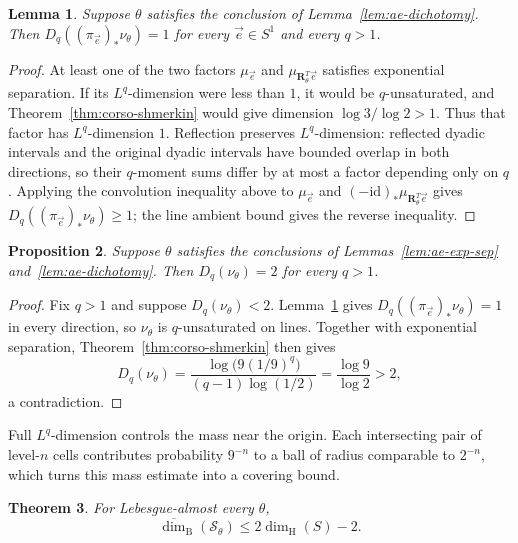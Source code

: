 \documentclass[scheme=plain]{ctexart}
\newtheorem{theorem}{Theorem}[section]
\newtheorem{lemma}[theorem]{Lemma}
\newtheorem{proposition}[theorem]{Proposition}
\newcommand{\dimhaus}{\dim_\mathrm{H}}
\begin{document}
\begin{lemma}
\label{lem:line-lq}
Suppose $\theta$ satisfies the conclusion of Lemma~\ref{lem:ae-dichotomy}.
Then $D_q((\pi_{\vec e})_*\nu_\theta)=1$ for every $\vec e\in S^1$ and every $q>1$.
\end{lemma}

\begin{proof}
At least one of the two factors $\mu_{\vec e}$ and $\mu_{\mathbf R_\theta^T\vec e}$ satisfies exponential separation.
If its $L^q$-dimension were less than $1$, it would be $q$-unsaturated, and Theorem~\ref{thm:corso-shmerkin} would give dimension $\log3/\log2>1$.
Thus that factor has $L^q$-dimension $1$.
Reflection preserves $L^q$-dimension: reflected dyadic intervals and the original dyadic intervals have bounded overlap in both directions, so their $q$-moment sums differ by at most a factor depending only on $q$.
Applying the convolution inequality above to $\mu_{\vec e}$ and $(-\mathrm{id})_*\mu_{\mathbf R_\theta^T\vec e}$ gives $D_q((\pi_{\vec e})_*\nu_\theta)\ge1$; the line ambient bound gives the reverse inequality.
\end{proof}

\begin{proposition}
\label{prop:nu-lq}
Suppose $\theta$ satisfies the conclusions of Lemmas~\ref{lem:ae-exp-sep} and~\ref{lem:ae-dichotomy}.
Then $D_q(\nu_\theta)=2$ for every $q>1$.
\end{proposition}

\begin{proof}
Fix $q>1$ and suppose $D_q(\nu_\theta)<2$.
Lemma~\ref{lem:line-lq} gives $D_q((\pi_{\vec e})_*\nu_\theta)=1$ in every direction, so $\nu_\theta$ is $q$-unsaturated on lines.
Together with exponential separation, Theorem~\ref{thm:corso-shmerkin} then gives
\[
D_q(\nu_\theta)
=\frac{\log\bigl(9(1/9)^q\bigr)}{(q-1)\log(1/2)}
=\frac{\log9}{\log2}>2,
\]
a contradiction.
\end{proof}

Full $L^q$-dimension controls the mass near the origin.
Each intersecting pair of level-$n$ cells contributes probability $9^{-n}$ to a ball of radius comparable to $2^{-n}$, which turns this mass estimate into a covering bound.

\begin{theorem}
\label{thm:ae-upper}
For Lebesgue-almost every $\theta$,
\[
\overline{\dim}_{\mathrm B}(\mathcal S_\theta)\le2\dimhaus(S)-2.
\]
\end{theorem}
\end{document}
